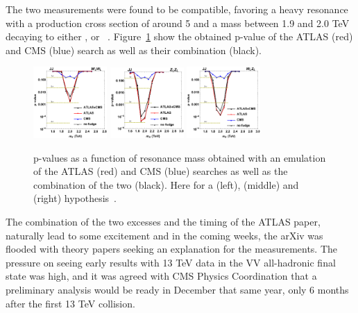 The two measurements were found to be compatible, favoring a heavy resonance with a production cross section of around 5 \fbinv and a mass between 1.9 and 2.0 TeV decaying to either \PW\PW, \PW\PZ or \PZ\PZ~\cite{Dias:2015mhm}. Figure~\ref{fig:searchI:8tevcombo} show the obtained p-value of the ATLAS (red) and CMS (blue) search as well as their combination (black).  

\begin{figure}[ht] 
    \centering
    \includegraphics[width=0.25\textwidth]{figures/analysis/search1/misc/CMS_ATLAS_BulkWW_JJ_dijetfit_p.png}
    \includegraphics[width=0.25\textwidth]{figures/analysis/search1/misc/CMS_ATLAS_BulkZZ_JJ_dijetfit_p.png}
    \includegraphics[width=0.25\textwidth]{figures/analysis/search1/misc/CMS_ATLAS_WZ_JJ_dijetfit_p.png}
    \caption{p-values as a function of resonance mass obtained with an emulation of the ATLAS (red) and CMS (blue) searches as well as the combination of the two (black). Here for a \PW\PW (left), \PW\PZ (middle) and \PZ\PZ (right) hypothesis~\cite{Dias:2015mhm}.}
    \label{fig:searchI:8tevcombo}
\end{figure}

The combination of the two excesses and the timing of the ATLAS paper, naturally lead to some excitement and in the coming weeks, the arXiv was flooded with theory papers seeking an explanation for the measurements.
The pressure on seeing early results with 13 TeV data in the VV all-hadronic final state was high, and it was agreed with CMS Physics Coordination that a preliminary analysis would be ready in December that same year, only 6 months after the first 13 TeV collision.

